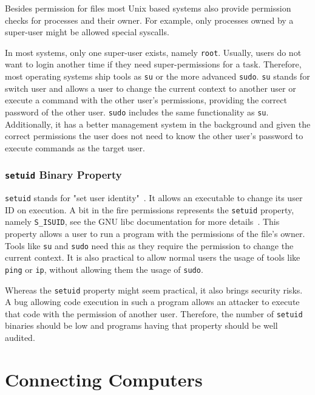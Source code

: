 Besides permission for files most Unix based systems also provide permission
checks for processes and their owner. For example, only processes owned by a
super-user might be allowed special syscalls.

In most systems, only one super-user exists, namely \texttt{root}. Usually,
users do not want to login another time if they need super-permissions for a
task. Therefore, most operating systems ship tools as \texttt{su} or the more
advanced \texttt{sudo}. \texttt{su} stands for switch user and allows a user to
change the current context to another user or execute a command with the other
user's permissions, providing the correct password of the other user.
\texttt{sudo} includes the same functionality as \texttt{su}. Additionally, it
has a better management system in the background and given the correct
permissions the user does not need to know the other user's password to execute
commands as the target user.

\subsubsection{\texttt{setuid} Binary Property}

\texttt{setuid} stands for "set user identity"~\cite{ogroupsetuid}. It allows an
executable to change its user ID on execution. A bit in the fire permissions
represents the \texttt{setuid} property, namely \texttt{S\_ISUID}, see the GNU
libc documentation for more details~\cite{libcpermission}. This property allows
a user to run a program with the permissions of the file's owner. Tools like
\texttt{su} and \texttt{sudo} need this as they require the permission to change
the current context. It is also practical to allow normal users the usage of
tools like \texttt{ping} or \texttt{ip}, without allowing them the usage of
\texttt{sudo}.

Whereas the \texttt{setuid} property might seem practical, it also brings
security risks. A bug allowing code execution in such a program allows an
attacker to execute that code with the permission of another user. Therefore,
the number of \texttt{setuid} binaries should be low and programs having that
property should be well audited.

\section{Connecting Computers}

